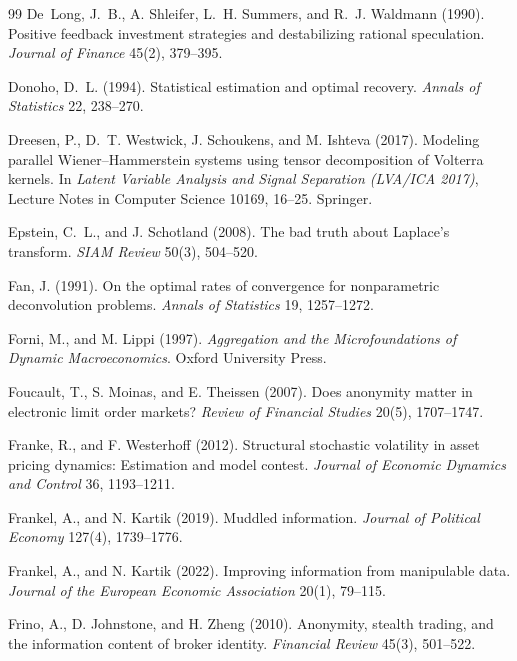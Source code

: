 \documentclass[12pt]{article}
\theoremstyle{definition}
\theoremstyle{remark}
\begin{document}
\begin{thebibliography}{99}
 De~Long, J.~B., A. Shleifer, L.~H. Summers, and R.~J. Waldmann (1990). Positive feedback investment strategies and destabilizing rational speculation. \emph{Journal of Finance} 45(2), 379--395.

 Donoho, D.~L. (1994). Statistical estimation and optimal recovery. \emph{Annals of Statistics} 22, 238--270.

 Dreesen, P., D.~T. Westwick, J. Schoukens, and M. Ishteva (2017). Modeling parallel Wiener--Hammerstein systems using tensor decomposition of Volterra kernels. In \emph{Latent Variable Analysis and Signal Separation (LVA/ICA 2017)}, Lecture Notes in Computer Science 10169, 16--25. Springer.

 Epstein, C.~L., and J. Schotland (2008). The bad truth about Laplace's transform. \emph{SIAM Review} 50(3), 504--520.

 Fan, J. (1991). On the optimal rates of convergence for nonparametric deconvolution problems. \emph{Annals of Statistics} 19, 1257--1272.

 Forni, M., and M. Lippi (1997). \emph{Aggregation and the Microfoundations of Dynamic Macroeconomics}. Oxford University Press.

 Foucault, T., S. Moinas, and E. Theissen (2007). Does anonymity matter in electronic limit order markets? \emph{Review of Financial Studies} 20(5), 1707--1747.

 Franke, R., and F. Westerhoff (2012). Structural stochastic volatility in asset pricing dynamics: Estimation and model contest. \emph{Journal of Economic Dynamics and Control} 36, 1193--1211.

 Frankel, A., and N. Kartik (2019). Muddled information. \emph{Journal of Political Economy} 127(4), 1739--1776.

 Frankel, A., and N. Kartik (2022). Improving information from manipulable data. \emph{Journal of the European Economic Association} 20(1), 79--115.

 Frino, A., D. Johnstone, and H. Zheng (2010). Anonymity, stealth trading, and the information content of broker identity. \emph{Financial Review} 45(3), 501--522.


\end{thebibliography}
\end{document}
